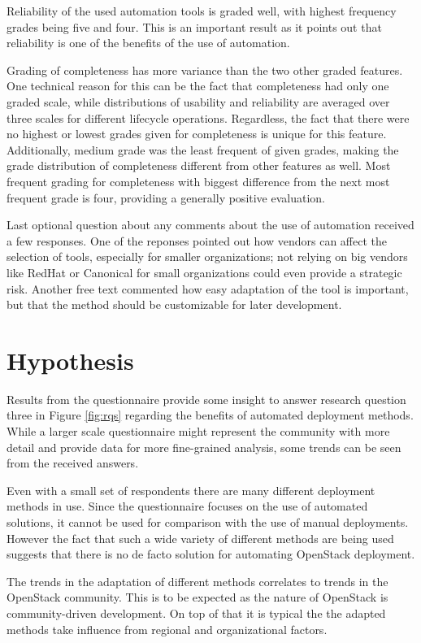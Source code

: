 \documentclass[officiallayout]{tktla}
\begin{document}
Reliability of the used automation tools is graded well, with highest frequency
grades being five and four. This is an important result as it points out that
reliability is one of the benefits of the use of automation.

Grading of completeness has more variance than the two other graded features.
One technical reason for this can be the fact that completeness had only one
graded scale, while distributions of usability and reliability are averaged
over three scales for different lifecycle operations. Regardless, the fact that
there were no highest or lowest grades given for completeness is unique for
this feature. Additionally, medium grade was the least frequent of given
grades, making the grade distribution of completeness different from other
features as well. Most frequent grading for completeness with biggest
difference from the next most frequent grade is four, providing a generally
positive evaluation.

Last optional question about any comments about the use of automation received
a few responses. One of the reponses pointed out how vendors can affect the
selection of tools, especially for smaller organizations; not relying on big
vendors like RedHat or Canonical for small organizations could even provide a
strategic risk. Another free text commented how easy adaptation of the tool is
important, but that the method should be customizable for later development.

\section{Hypothesis}

Results from the questionnaire provide some insight to answer research question
three in Figure \ref{fig:rqs} regarding the benefits of automated deployment
methods. While a larger scale questionnaire might represent the community with
more detail and provide data for more fine-grained analysis, some trends can be
seen from the received answers.

Even with a small set of respondents there are many different deployment
methods in use. Since the questionnaire focuses on the use of automated
solutions, it cannot be used for comparison with the use of manual deployments.
However the fact that such a wide variety of different methods are being used
suggests that there is no de facto solution for automating OpenStack
deployment.

The trends in the adaptation of different methods correlates to trends in the
OpenStack community. This is to be expected as the nature of OpenStack is
community-driven development. On top of that it is typical the the adapted
methods take influence from regional and organizational factors.
\end{document}

